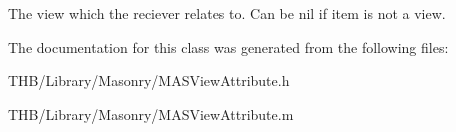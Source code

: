 The view which the reciever relates to. Can be nil if item is not a view. 

The documentation for this class was generated from the following files\+:\begin{DoxyCompactItemize}
\item 
T\+H\+B/\+Library/\+Masonry/M\+A\+S\+View\+Attribute.\+h\item 
T\+H\+B/\+Library/\+Masonry/M\+A\+S\+View\+Attribute.\+m\end{DoxyCompactItemize}
